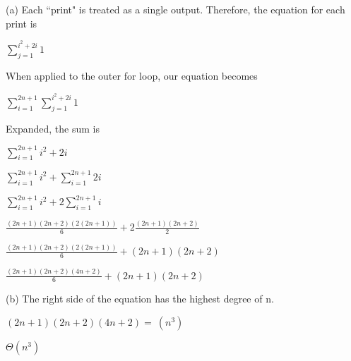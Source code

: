 \begin{solution}
(a) Each ``print" is treated as a single output. Therefore, the equation for each print is

\begin{center}
$\sum\limits_{j=1}^{i^2 + 2i} 1$
\end{center}

When applied to the outer for loop, our equation becomes

\begin{center}
$ \sum\limits_{i=1}^{2n+1}\sum\limits_{j=1}^{i^2 + 2i} 1$
\end{center}

Expanded, the sum is

\begin{center}
$ \sum\limits_{i=1}^{2n+1} i^2 + 2i$
\end{center}

\begin{center}
$ \sum\limits_{i=1}^{2n+1} i^2 +  \sum\limits_{i=1}^{2n+1} 2i$
\end{center}

\begin{center}
$ \sum\limits_{i=1}^{2n+1} i^2 +  2\sum\limits_{i=1}^{2n+1} i$
\end{center}

\begin{center}
$\frac{(2n+1)(2n+2)(2(2n+1))}{6} + 2\frac{(2n+1)(2n+2)}{2}$
\end{center}

\begin{center}
$\frac{(2n+1)(2n+2)(2(2n+1))}{6} + (2n+1)(2n+2)$
\end{center}

\begin{center}
$\frac{(2n+1)(2n+2)(4n+2)}{6} + (2n+1)(2n+2)$
\end{center}
(b) The right side of the equation has the highest degree of n. 

\begin{center}
$(2n+1)(2n+2)(4n+2) = ~(n^3)$

$
\Theta (n^3)$
\end{center}

\end{solution}
